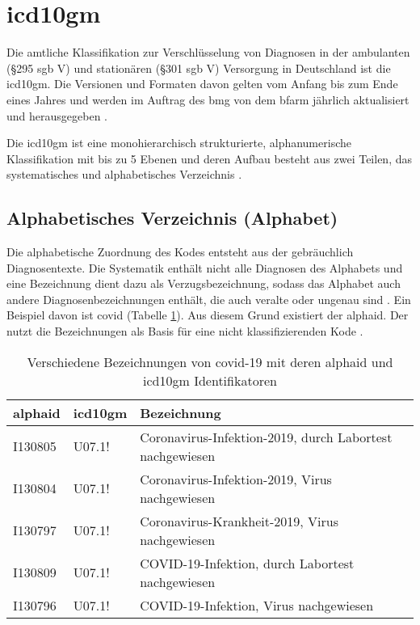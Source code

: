 \section{\acs{icd10gm}}
Die amtliche Klassifikation zur Verschlüsselung von Diagnosen in der ambulanten (\S 295 \ac{sgb} V) und stationären (\S 301 \ac{sgb} V) Versorgung in Deutschland ist die \ac{icd10gm}. Die Versionen und Formaten davon gelten vom Anfang bis zum Ende eines Jahres und werden im Auftrag des \ac{bmg} von dem \ac{bfarm} jährlich aktualisiert und herausgegeben \cite{icd10}. 

Die \ac{icd10gm} ist eine monohierarchisch strukturierte, alphanumerische Klassifikation mit bis zu 5 Ebenen und deren Aufbau besteht aus zwei Teilen, das systematisches und alphabetisches Verzeichnis \cite{icd10}.
\subsection{Alphabetisches Verzeichnis (Alphabet)} \label{alphadir}
Die alphabetische Zuordnung des Kodes entsteht aus der gebräuchlich Diagnosentexte. Die Systematik enthält nicht alle Diagnosen des Alphabets und eine Bezeichnung dient dazu als Verzugsbezeichnung, sodass das Alphabet auch andere Diagnosenbezeichnungen enthält, die auch veralte oder ungenau sind \cite{icd10alpha}. Ein Beispiel davon ist \ac{covid} (Tabelle \ref{tab:difbe}). Aus diesem Grund existiert der \ac{alphaid}. Der nutzt die Bezeichnungen als Basis für eine nicht klassifizierenden Kode \cite{icd10alpha}.

\begin{table}[ht]
	\centering
	\small
	\caption[Verschiedene Bezeichnungen von COVID-19]{Verschiedene Bezeichnungen von \ac{covid}-19 mit deren \ac{alphaid} und \ac{icd10gm} Identifikatoren}
	\label{tab:difbe}
	\begin{tabular}{|l|l|l|}
		\hline
		\rowcolor{lightgray} \ac{alphaid} & \ac{icd10gm} & Bezeichnung \\
		\hline
		I130805 & U07.1! & Coronavirus-Infektion-2019, durch Labortest nachgewiesen \\ \hline
		I130804 & U07.1! & Coronavirus-Infektion-2019, Virus nachgewiesen \\ \hline
		I130797 & U07.1! & Coronavirus-Krankheit-2019, Virus nachgewiesen \\ \hline
		I130809 & U07.1! & COVID-19-Infektion, durch Labortest nachgewiesen \\ \hline
		I130796 & U07.1! & COVID-19-Infektion, Virus nachgewiesen \\ \hline				
	\end{tabular}
\end{table}

